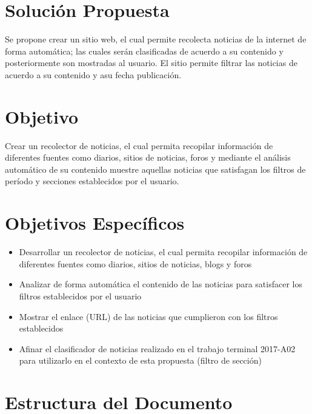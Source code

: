 \section{Solución Propuesta}


Se propone crear un sitio web, el cual permite recolecta noticias de la internet de forma automática; las cuales serán  clasificadas de acuerdo a su contenido y posteriormente son mostradas al usuario. El sitio permite filtrar las noticias de acuerdo a su contenido y asu fecha publicación.


\section{Objetivo}

  Crear un recolector de noticias, el cual permita recopilar información de diferentes fuentes como diarios, sitios de noticias, foros y mediante el análisis automático de su contenido muestre aquellas noticias que satisfagan los filtros de período y secciones establecidos por el usuario.
  

\section{Objetivos Específicos}
\begin{itemize}
  \item Desarrollar un recolector de noticias, el cual permita recopilar información de diferentes fuentes como diarios, sitios de noticias, blogs y foros
  \item Analizar de forma automática el contenido de las noticias para satisfacer los filtros establecidos por el usuario
  \item Mostrar el enlace (URL) de las noticias que cumplieron con los filtros establecidos
  \item Afinar el clasificador de noticias realizado en el trabajo terminal 2017-A02 para utilizarlo en el contexto de esta propuesta (filtro de sección) 

\end{itemize}
\section{Estructura del Documento}